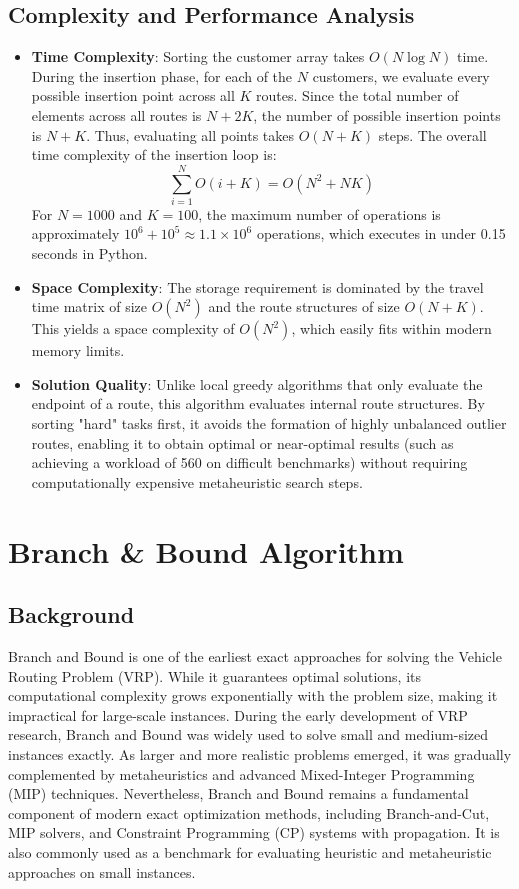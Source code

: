 \documentclass[11pt]{article}
\begin{document}
\subsection{Complexity and Performance Analysis}
\begin{itemize}
    \item \textbf{Time Complexity}: Sorting the customer array takes $O(N \log N)$ time. During the insertion phase, for each of the $N$ customers, we evaluate every possible insertion point across all $K$ routes. Since the total number of elements across all routes is $N + 2K$, the number of possible insertion points is $N + K$. Thus, evaluating all points takes $O(N + K)$ steps. The overall time complexity of the insertion loop is:
    \begin{equation}
        \sum_{i=1}^{N} O(i + K) = O(N^2 + NK)
    \end{equation}
    For $N = 1000$ and $K = 100$, the maximum number of operations is approximately $10^6 + 10^5 \approx 1.1 \times 10^6$ operations, which executes in under 0.15 seconds in Python.
    \item \textbf{Space Complexity}: The storage requirement is dominated by the travel time matrix of size $O(N^2)$ and the route structures of size $O(N + K)$. This yields a space complexity of $O(N^2)$, which easily fits within modern memory limits.
    \item \textbf{Solution Quality}: Unlike local greedy algorithms that only evaluate the endpoint of a route, this algorithm evaluates internal route structures. By sorting "hard" tasks first, it avoids the formation of highly unbalanced outlier routes, enabling it to obtain optimal or near-optimal results (such as achieving a workload of 560 on difficult benchmarks) without requiring computationally expensive metaheuristic search steps.
\end{itemize}

\section{Branch \& Bound Algorithm}
\subsection{Background}
Branch and Bound is one of the earliest exact approaches for solving the Vehicle Routing Problem (VRP). While it guarantees optimal solutions, its computational complexity grows exponentially with the problem size, making it impractical for large-scale instances. During the early development of VRP research, Branch and Bound was widely used to solve small and medium-sized instances exactly. As larger and more realistic problems emerged, it was gradually complemented by metaheuristics and advanced Mixed-Integer Programming (MIP) techniques. Nevertheless, Branch and Bound remains a fundamental component of modern exact optimization methods, including Branch-and-Cut, MIP solvers, and Constraint Programming (CP) systems with propagation. It is also commonly used as a benchmark for evaluating heuristic and metaheuristic approaches on small instances. 
\end{document}
